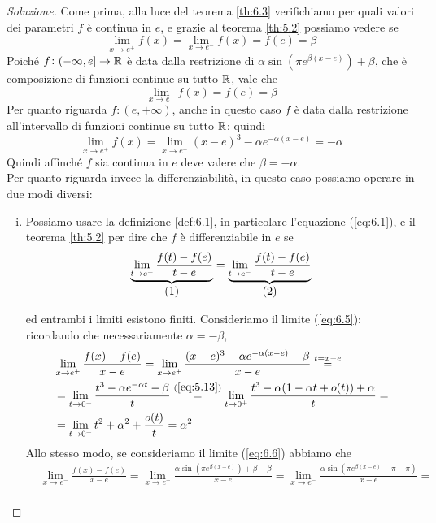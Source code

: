 \begin{proof}[Soluzione]
    Come prima, alla luce del teorema \ref{th:6.3} verifichiamo per quali valori dei parametri $f$ è continua in $e$, e grazie al teorema \ref{th:5.2} possiamo vedere se
    \[
    \lim_{x\to e^+} f(x) = \lim_{x\to e^-} f(x) = f(e) = \beta
    \]
    Poiché $f\colon (-\infty, e]\to \amsbb{R}$ è data dalla restrizione di $\alpha\sin(\pi e^{\beta(x-e)})+\beta$, che è composizione di funzioni continue su tutto $\amsbb{R}$, vale che
    \[
    \lim_{x\to e^-}f(x) = f(e) = \beta
    \]
    Per quanto riguarda $f\colon (e, +\infty)$, anche in questo caso $f$ è data dalla restrizione all'intervallo di funzioni continue su tutto $\amsbb{R}$; quindi
    \[
    \lim_{x\to e^+}f(x) = \lim_{x\to e^+} (x-e)^3-\alpha e^{-\alpha (x-e)} = -\alpha
    \]
    Quindi affinché $f$ sia continua in $e$ deve valere che $\beta = -\alpha$.\\
    Per quanto riguarda invece la differenziabilità, in questo caso possiamo operare in due modi diversi:
    \begin{enumerate}[(i)]
        \item Possiamo usare la definizione \ref{def:6.1}, in particolare l'equazione (\ref{eq:6.1}), e il teorema \ref{th:5.2} per dire che $f$ è differenziabile in $e$ se
        \[
        \underbrace{\lim_{t\to e^+}\frac{f(t)-f(e)}{t-e}}_{\stepcounter{equation}\mbox{(\theequation)}} = \underbrace{\lim_{t\to e^-}\frac{f(t)-f(e)}{t-e}}_{\stepcounter{equation}\mbox{(\theequation)}}
        \]
        \addtocounter{equation}{-2}\label{eq:6.5}
        \addtocounter{equation}{0}\label{eq:6.6}
        ed entrambi i limiti esistono finiti. Consideriamo il limite (\ref{eq:6.5}): ricordando che necessariamente $\alpha=-\beta$,
        \[
        \begin{split}
            &\lim_{x\to e^+} \frac{f(x)-f(e)}{x-e} = \lim_{x\to e^+} \frac{(x-e)^3 - \alpha e^{-\alpha(x-e)}-\beta}{x-e} \overset{t=x-e}{=} \\
            & = \lim_{t\to 0^+} \frac{t^3-\alpha e^{-\alpha t}-\beta}{t} \overset{(\ref{eq:5.13})}{=} \lim_{t\to 0^+} \frac{t^3-\alpha(1-\alpha t + o(t))+\alpha}{t} = \\
            & = \lim_{t\to 0^+} t^2 +\alpha^2 + \frac{o(t)}{t} = \alpha^2
        \end{split}
        \]
        Allo stesso modo, se consideriamo il limite (\ref{eq:6.6}) abbiamo che
        \[
        \begin{split}
            & \lim_{x\to e^-} \frac{f(x)-f(e)}{x-e} = \lim_{x\to e^-}\frac{\alpha\sin(\pi e^{\beta(x-e)})+\beta-\beta}{x-e} = \lim_{x\to e^-} \frac{\alpha\sin(\pi e^{\beta(x-e)}+\pi -\pi)}{x-e} = \\

\end{split}\]
\end{enumerate}
\end{proof}

